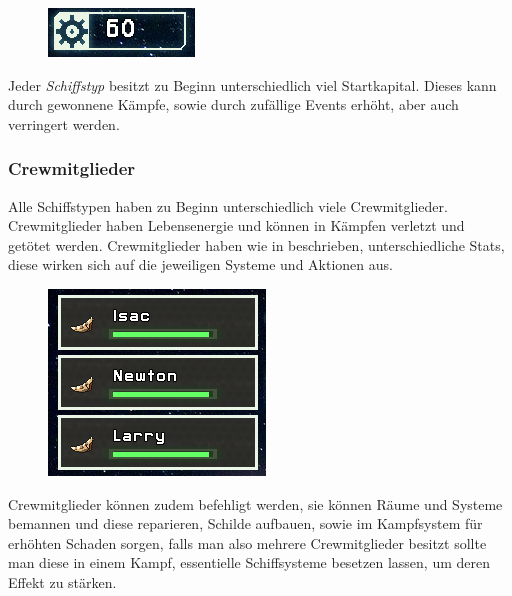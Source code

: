 \documentclass[fontsize=12pt,paper=a4,twoside]{scrartcl}
\begin{document}
\begin{figure}[H]
\centering
\includegraphics[width=0.4\linewidth]{DasSpiel/Ui/Money.png}
\end{figure}

Jeder \textit{Schiffstyp} besitzt zu Beginn unterschiedlich viel Startkapital. Dieses kann durch gewonnene Kämpfe, sowie durch zufällige Events erhöht, aber auch verringert werden. 

\subsubsection{Crewmitglieder}
Alle Schiffstypen haben zu Beginn unterschiedlich viele Crewmitglieder. Crewmitglieder haben Lebensenergie und können in Kämpfen verletzt und getötet werden. Crewmitglieder haben wie in  beschrieben, unterschiedliche Stats, diese wirken sich auf die jeweiligen Systeme und Aktionen aus.
\begin{figure}[H]
\centering
\includegraphics[width=0.4\linewidth]{DasSpiel/Ui/Crew.png}
\end{figure}
Crewmitglieder können zudem befehligt werden, sie können Räume und Systeme bemannen und diese reparieren, Schilde aufbauen, sowie im Kampfsystem für erhöhten Schaden sorgen, falls man also mehrere Crewmitglieder besitzt sollte man diese in einem Kampf, essentielle Schiffsysteme besetzen lassen, um deren Effekt zu stärken.
\end{document}
